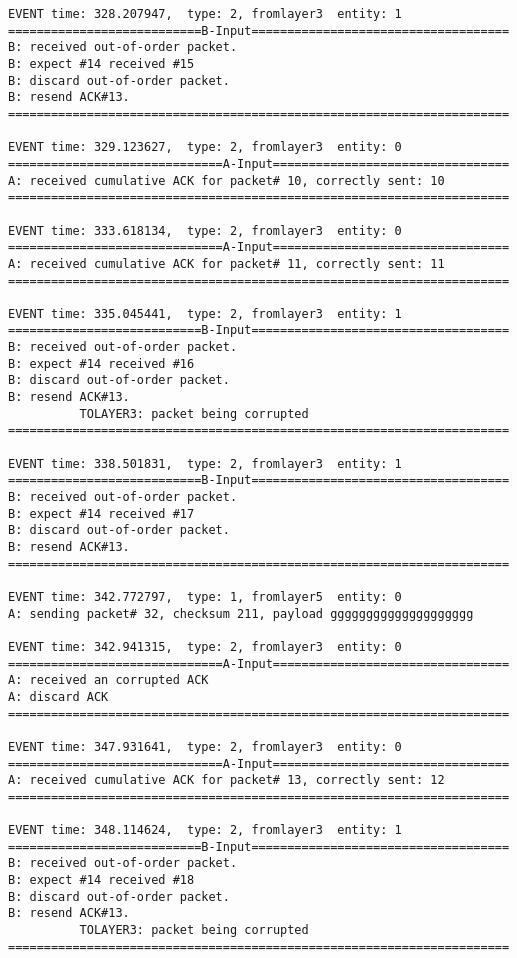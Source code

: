 \documentclass[12pt]{article}
\begin{document}
\begin{verbatim}
EVENT time: 328.207947,  type: 2, fromlayer3  entity: 1
===========================B-Input====================================
B: received out-of-order packet.
B: expect #14 received #15
B: discard out-of-order packet.
B: resend ACK#13.
======================================================================

EVENT time: 329.123627,  type: 2, fromlayer3  entity: 0
==============================A-Input=================================
A: received cumulative ACK for packet# 10, correctly sent: 10
======================================================================

EVENT time: 333.618134,  type: 2, fromlayer3  entity: 0
==============================A-Input=================================
A: received cumulative ACK for packet# 11, correctly sent: 11
======================================================================

EVENT time: 335.045441,  type: 2, fromlayer3  entity: 1
===========================B-Input====================================
B: received out-of-order packet.
B: expect #14 received #16
B: discard out-of-order packet.
B: resend ACK#13.
          TOLAYER3: packet being corrupted
======================================================================

EVENT time: 338.501831,  type: 2, fromlayer3  entity: 1
===========================B-Input====================================
B: received out-of-order packet.
B: expect #14 received #17
B: discard out-of-order packet.
B: resend ACK#13.
======================================================================

EVENT time: 342.772797,  type: 1, fromlayer5  entity: 0
A: sending packet# 32, checksum 211, payload gggggggggggggggggggg

EVENT time: 342.941315,  type: 2, fromlayer3  entity: 0
==============================A-Input=================================
A: received an corrupted ACK 
A: discard ACK
======================================================================

EVENT time: 347.931641,  type: 2, fromlayer3  entity: 0
==============================A-Input=================================
A: received cumulative ACK for packet# 13, correctly sent: 12
======================================================================

EVENT time: 348.114624,  type: 2, fromlayer3  entity: 1
===========================B-Input====================================
B: received out-of-order packet.
B: expect #14 received #18
B: discard out-of-order packet.
B: resend ACK#13.
          TOLAYER3: packet being corrupted
======================================================================


\end{verbatim}
\end{document}
